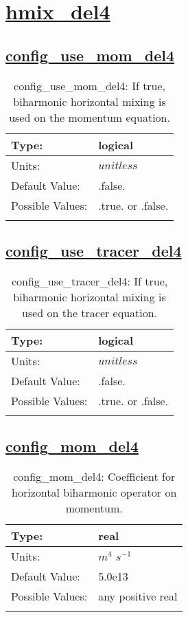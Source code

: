 \section[hmix\_del4]{\hyperref[sec:nm_tab_hmix_del4]{hmix\_del4}}
\label{sec:nm_sec_hmix_del4}
\subsection[config\_use\_mom\_del4]{\hyperref[sec:nm_tab_hmix_del4]{config\_use\_mom\_del4}}
\label{subsec:nm_sec_config_use_mom_del4}
\begin{center}
\begin{longtable}{| p{2.0in} || p{4.0in} |}
    \hline
    Type: & logical \\
    \hline
    Units: & $unitless$ \\
    \hline
    Default Value: & .false. \\
    \hline
    Possible Values: & .true. or .false. \\
    \hline
    \caption{config\_use\_mom\_del4: If true, biharmonic horizontal mixing is used on the momentum equation.}
\end{longtable}
\end{center}
\subsection[config\_use\_tracer\_del4]{\hyperref[sec:nm_tab_hmix_del4]{config\_use\_tracer\_del4}}
\label{subsec:nm_sec_config_use_tracer_del4}
\begin{center}
\begin{longtable}{| p{2.0in} || p{4.0in} |}
    \hline
    Type: & logical \\
    \hline
    Units: & $unitless$ \\
    \hline
    Default Value: & .false. \\
    \hline
    Possible Values: & .true. or .false. \\
    \hline
    \caption{config\_use\_tracer\_del4: If true, biharmonic horizontal mixing is used on the tracer equation.}
\end{longtable}
\end{center}
\subsection[config\_mom\_del4]{\hyperref[sec:nm_tab_hmix_del4]{config\_mom\_del4}}
\label{subsec:nm_sec_config_mom_del4}
\begin{center}
\begin{longtable}{| p{2.0in} || p{4.0in} |}
    \hline
    Type: & real \\
    \hline
    Units: & $m^4$ $s^{-1}$ \\
    \hline
    Default Value: & 5.0e13 \\
    \hline
    Possible Values: & any positive real \\
    \hline
    \caption{config\_mom\_del4: Coefficient for horizontal biharmonic operator on momentum.}
\end{longtable}
\end{center}
